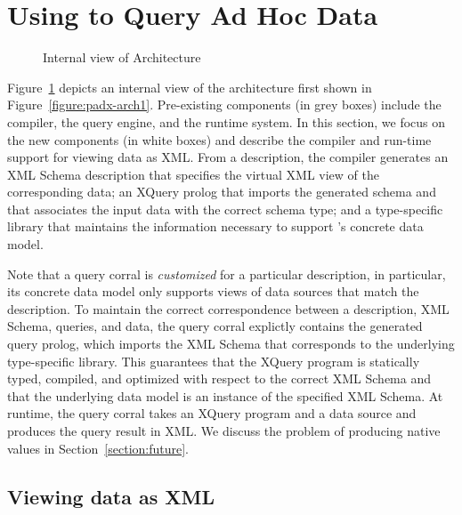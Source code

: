 \section{Using \padx{} to Query Ad Hoc Data}
\label{section:padx}

\begin{figure}
\begin{center}
\end{center}
\caption{Internal view of \padx{} Architecture}
\label{figure:padx-arch}
\end{figure}

Figure~\ref{figure:padx-arch} depicts an internal view of the \padx{}
architecture first shown in Figure~\ref{figure:padx-arch1}.
Pre-existing components (in grey boxes) include the \pads{} compiler,
the \Galax{} query engine, and the \pads{} runtime system.  In this
section, we focus on the new components (in white boxes) and describe
the compiler and run-time support for viewing \pads{} data as XML.
From a \pads{} description, the compiler generates an XML Schema
description that specifies the virtual XML view of the corresponding
\pads{} data; an XQuery prolog that imports the generated schema and
that associates the input data with the correct schema type; and a
type-specific library that maintains the information necessary to
support \padx{}'s concrete data model.  

Note that a query corral is \emph{customized} for a particular \pads{}
description, in particular, its concrete data model only supports
views of data sources that match the \pads{} description.  To maintain
the correct correspondence between a description, XML Schema, queries,
and data, the query corral explictly contains the generated query
prolog, which imports the XML Schema that corresponds to the
underlying type-specific library.  This guarantees that the XQuery
program is statically typed, compiled, and optimized with respect to
the correct XML Schema and that the underlying data model is an
instance of the specified XML Schema.  At runtime, the query corral
takes an XQuery program and a \pads{} data source and produces the
query result in XML.  We discuss the problem of producing native
\pads{} values in Section~\ref{section:future}.

\subsection{Viewing \pads{} data as XML}	

